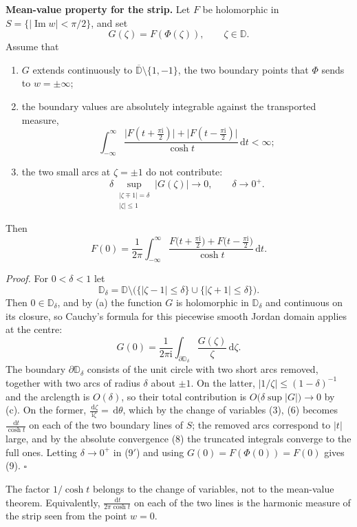 \documentclass[12pt]{article}
\newcommand{\dd}{\,\mathrm{d}}
\newcommand{\ii}{\mathrm{i}}
\newcommand{\D}{\mathbb D}
\newcommand{\Ip}{\operatorname{Im}}
\begin{document}
\textbf{Mean-value property for the strip.}
Let \(F\) be holomorphic in \(S=\{|\Ip w|<\pi/2\}\), and set
\[
G(\zeta)=F(\Phi(\zeta)),\qquad \zeta\in\D .
\]
Assume that
\begin{enumerate}
\item[(a)] \(G\) extends continuously to
\(\overline{\D}\setminus\{1,-1\}\), the two boundary points that
\(\Phi\) sends to \(w=\pm\infty\);
\item[(b)] the boundary values are absolutely integrable against the
transported measure,
\[
\int_{-\infty}^{\infty}
\frac{\bigl|F(t+\tfrac{\pi\ii}2)\bigr|+\bigl|F(t-\tfrac{\pi\ii}2)\bigr|}
{\cosh t}\dd t<\infty ;
\tag{8}
\]
\item[(c)] the two small arcs at \(\zeta=\pm1\) do not contribute:
\[
\delta\!\!\sup_{\substack{|\zeta\mp1|=\delta\\ |\zeta|\le1}}\!\!|G(\zeta)|
\longrightarrow0,
\qquad\delta\to0^+ .
\tag{8$'$}
\]
\end{enumerate}
Then
\[
\boxed{\displaystyle
F(0)=
\frac1{2\pi}
\int_{-\infty}^{\infty}
\frac{F\bigl(t+\tfrac{\pi\ii}2\bigr)+F\bigl(t-\tfrac{\pi\ii}2\bigr)}
{\cosh t}\dd t.}
\tag{9}
\]

\textit{Proof.} For \(0<\delta<1\) let
\[
\D_\delta=\D\setminus\bigl(\{|\zeta-1|\le\delta\}\cup\{|\zeta+1|\le\delta\}\bigr).
\]
Then \(0\in\D_\delta\), and by (a) the function \(G\) is holomorphic in
\(\D_\delta\) and continuous on its closure, so Cauchy's formula for this
piecewise smooth Jordan domain applies at the centre:
\[
G(0)=\frac1{2\pi\ii}\int_{\partial\D_\delta}\frac{G(\zeta)}{\zeta}\dd\zeta .
\tag{9$'$}
\]
The boundary \(\partial\D_\delta\) consists of the unit circle with two
short arcs removed, together with two arcs of radius \(\delta\) about
\(\pm1\). On the latter, \(|1/\zeta|\le(1-\delta)^{-1}\) and the
arclength is \(O(\delta)\), so their total contribution is
\(O\bigl(\delta\sup|G|\bigr)\to0\) by (c). On the former,
\(\frac{\dd\zeta}{\ii\zeta}=\dd\theta\), which by the change of variables
(3), (6) becomes \(\frac{\dd t}{\cosh t}\) on each of the two boundary
lines of \(S\); the removed arcs correspond to \(|t|\) large, and by the
absolute convergence (8) the truncated integrals converge to the full
ones. Letting \(\delta\to0^+\) in (9\('\)) and using \(G(0)=F(\Phi(0))=F(0)\)
gives (9). \(\square\)

The factor \(1/\cosh t\) belongs to the change of variables, not to the
mean-value theorem. Equivalently, \(\frac{\dd t}{2\pi\cosh t}\) on each
of the two lines is the harmonic measure of the strip seen from the point
\(w=0\).
\end{document}
